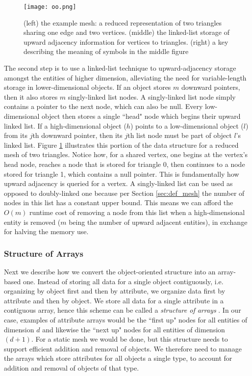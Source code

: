 \begin{figure}
\begin{center}
\texttt{[image: oo.png]}
\caption{(left) the example mesh: a reduced representation of two
triangles sharing one edge and two vertices.
(middle) the linked-list storage of upward adjacency information
for vertices to triangles.
(right) a key describing the meaning of symbols in the middle figure}
\label{fig:oo}
\end{center}
\end{figure}

The second step is to use a linked-list technique \cite{karamete2016novel}
to upward-adjacency storage amongst the entities
of higher dimension, alleviating the need for variable-length
storage in lower-dimensional objects.
If an object stores $m$ downward pointers, then it also stores
$m$ singly-linked list nodes.
A singly-linked list node simply contains a pointer to the next
node, which can also be null.
Every low-dimensional object then stores a single ``head" node
which begins their upward linked list.
If a high-dimensional object ($h$) points to a low-dimensional object ($l$)
from its $j$th downward pointer, then its $j$th list node must be
part of object $l$'s linked list.
Figure \ref{fig:oo} illustrates this portion of the data structure
for a reduced mesh of two triangles.
Notice how, for a shared vertex, one begins at the vertex's head node,
reaches a node that is stored for triangle 0, then continues
to a node stored for triangle 1, which contains a null pointer.
This is fundamentally how upward adjacency is queried for a vertex.
A singly-linked list can be used as opposed to doubly-linked one
because per Section \ref{sec:def_mesh}
the number of nodes in this list has a constant upper bound.
This means we can afford the $O(m)$ runtime cost of removing a node from this
list when a high-dimensional entity is removed
($m$ being the number of upward adjacent entities),
in exchange for halving the memory use.

\subsubsection{Structure of Arrays}
\label{sec:sisc_soa}

Next we describe how we convert the object-oriented structure
into an array-based one.
Instead of storing all data for a single object contiguously,
i.e. organizing by object first and then by attribute,
we organize data first by attribute and then by object.
We store all data for a single attribute in a contiguous
array, hence this scheme can be called a {\it structure of arrays}
\cite{sung2012dl}.
In our case, examples of attribute arrays would be
the ``first up" nodes for all entities of dimension $d$
and likewise the ``next up" nodes for all entities of dimension $(d+1)$.
For a static mesh we would be done, but this structure needs
to support efficient addition and removal of objects.
We therefore need to manage the arrays which store attributes
for all objects a single type, to account for addition and removal
of objects of that type.

